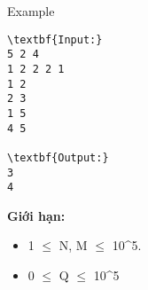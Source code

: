 Example
\begin{verbatim}
\textbf{Input:}
5 2 4
1 2 2 2 1
1 2
2 3
1 5
4 5

\textbf{Output:}
3
4\end{verbatim}


\textbf{Giới hạn:} 
\begin{itemize}
	\item 1  $\le$  N, M  $\le$  10^5.
	\item 0  $\le$  Q  $\le$  10^5
\end{itemize}